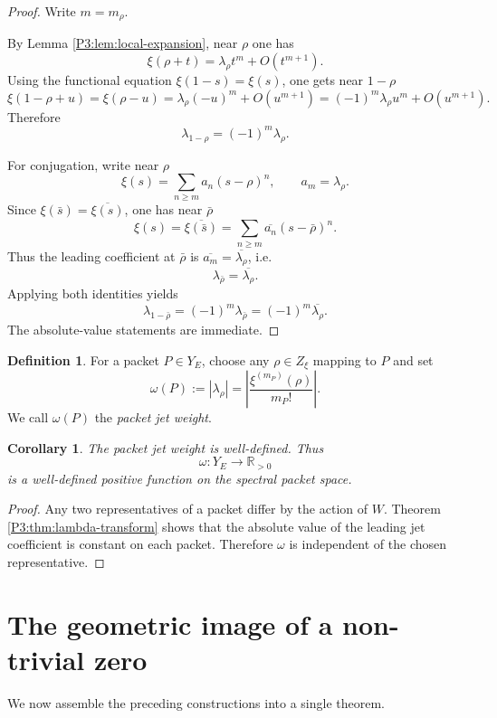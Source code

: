 \documentclass[11pt,a4paper]{article}
\numberwithin{equation}{section}
\newtheorem{corollary}[theorem]{Corollary}
\theoremstyle{definition}
\newtheorem{definition}[theorem]{Definition}
\theoremstyle{remark}
\newcommand{\RR}{\mathbb R}
\begin{document}
\begin{proof}
Write $m=m_\rho$.

By Lemma \ref{P3:lem:local-expansion}, near $\rho$ one has
\[
\xi(\rho+t)=\lambda_\rho t^m + O(t^{m+1}).
\]
Using the functional equation $\xi(1-s)=\xi(s)$, one gets near $1-\rho$
\[
\xi(1-\rho+u)=\xi(\rho-u)=\lambda_\rho (-u)^m + O(u^{m+1})
=(-1)^m\lambda_\rho u^m + O(u^{m+1}).
\]
Therefore
\[
\lambda_{1-\rho}=(-1)^m\lambda_\rho.
\]

For conjugation, write near $\rho$
\[
\xi(s)=\sum_{n\ge m} a_n (s-\rho)^n,
\qquad a_m=\lambda_\rho.
\]
Since $\xi(\bar s)=\overline{\xi(s)}$, one has near $\bar\rho$
\[
\xi(s)=\overline{\xi(\bar s)}=
\sum_{n\ge m} \overline{a_n}(s-\bar\rho)^n.
\]
Thus the leading coefficient at $\bar\rho$ is $\overline{a_m}=\overline{\lambda_\rho}$, i.e.
\[
\lambda_{\bar\rho}=\overline{\lambda_\rho}.
\]
Applying both identities yields
\[
\lambda_{1-\bar\rho}=(-1)^m\lambda_{\bar\rho}=(-1)^m\overline{\lambda_\rho}.
\]
The absolute-value statements are immediate.
\end{proof}

\begin{definition}
For a packet $P\in Y_E$, choose any $\rho\in Z_\xi$ mapping to $P$ and set
\[
\omega(P):=|\lambda_\rho|=\left|\frac{\xi^{(m_P)}(\rho)}{m_P!}\right|.
\]
We call $\omega(P)$ the \emph{packet jet weight}.
\end{definition}

\begin{corollary}\label{P3:cor:weight-well-defined}
The packet jet weight is well-defined.  Thus
\[
\omega:Y_E\longrightarrow \RR_{>0}
\]
is a well-defined positive function on the spectral packet space.
\end{corollary}

\begin{proof}
Any two representatives of a packet differ by the action of $W$.  Theorem \ref{P3:thm:lambda-transform} shows that the absolute value of the leading jet coefficient is constant on each packet.  Therefore $\omega$ is independent of the chosen representative.
\end{proof}

\section{The geometric image of a non-trivial zero}

We now assemble the preceding constructions into a single theorem.
\end{document}

